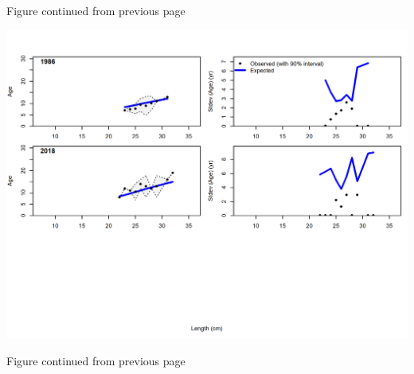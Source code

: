 \documentclass[12pt,]{article}
\begin{document}
\begin{center} 

              Figure continued from previous page 

             \end{center}

\includegraphics{./r4ss/plots_mod1/comp_condAALfit_Andre_plotsflt3mkt0_page3.png}

\begin{center} 

              Figure continued from previous page 

             \end{center}
\end{document}
